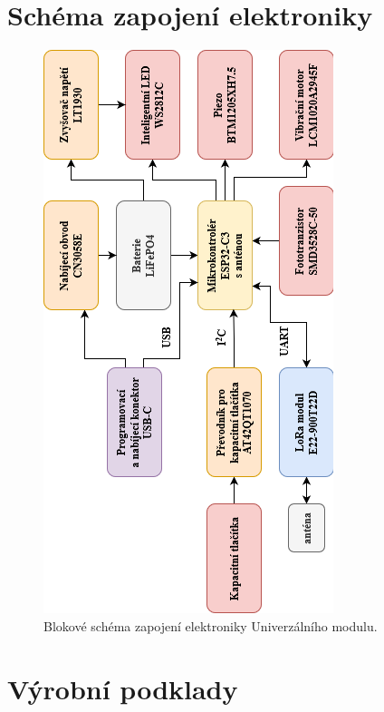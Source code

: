 \chapter{Schéma zapojení elektroniky}

\begin{figure}[!h]
	\begin{center}
	  \includegraphics[scale=1.2]{obrazky/blokove_schema_finalni_verze_priloha.png}
	\end{center}
	\caption[Blokové schéma zapojení elektroniky Univerzálního modulu]{Blokové schéma zapojení elektroniky Univerzálního modulu.}
\end{figure}





\chapter{Výrobní podklady}

